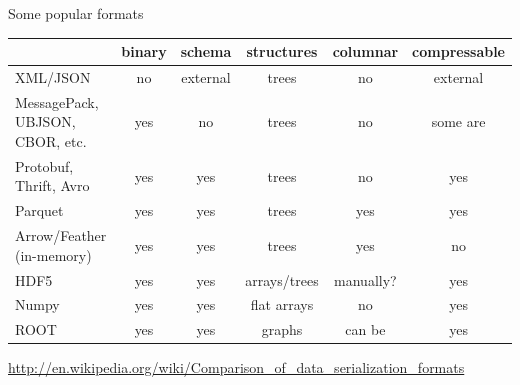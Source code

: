 \documentclass{beamer}
\begin{document}
\begin{frame}{Some popular formats}
\vspace{0.5 cm}
\renewcommand{\arraystretch}{1.2}
\mbox{\hspace{-0.8 cm}}\begin{tabular}{p{2 cm} c c c c c}
                          & binary & schema     & structures   & columnar & compressable\\\hline
XML/JSON                  & no     & external   & trees        & no       & external    \\
MessagePack, UBJSON, CBOR, etc.   & yes    & no         & trees        & no       & some are    \\
Protobuf, Thrift, Avro    & yes    & yes        & trees        & no       & yes         \\
Parquet                   & yes    & yes        & trees        & yes      & yes         \\
Arrow/Feather (in-memory) & yes    & yes        & trees        & yes      & no          \\
HDF5                      & yes    & yes        & arrays/trees & manually?& yes         \\
Numpy                     & yes    & yes        & flat arrays  & no       & yes         \\
ROOT                      & yes    & yes        & graphs       & can be   & yes         \\
\end{tabular}

\vspace{0.25 cm}
\scriptsize \mbox{\hspace{-0.5 cm}\textcolor{blue}{\url{http://en.wikipedia.org/wiki/Comparison_of_data_serialization_formats}}}
\end{frame}
\end{document}
